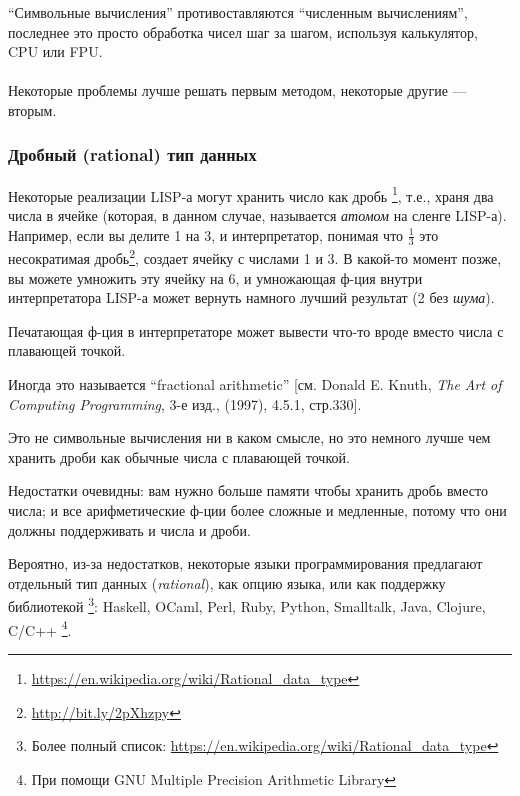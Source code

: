 ``Символьные вычисления'' противоставляются ``численным вычислениям'', последнее это просто обработка чисел шаг за шагом,
используя калькулятор, \ac{CPU} или \ac{FPU}.\\
\\
Некоторые проблемы лучше решать первым методом, некоторые другие --- вторым.

\subsubsection{Дробный (rational) тип данных}

Некоторые реализации LISP-а могут хранить число как дробь
\footnote{\url{https://en.wikipedia.org/wiki/Rational_data_type}}, т.е., храня два числа в ячейке (которая, в данном случае, называется \textit{атомом} на сленге LISP-а).
Например, если вы делите 1 на 3, и интерпретатор, понимая что $\frac{1}{3}$ это
несократимая дробь\footnote{\url{http://bit.ly/2pXhzpy}}, создает ячейку с числами 1 и 3.
В какой-то момент позже, вы можете умножить эту ячейку на 6, и умножающая ф-ция внутри интерпретатора LISP-а может вернуть
намного лучший результат (2 без \textit{шума}).

Печатающая ф-ция в интерпретаторе может вывести что-то вроде  вместо числа с плавающей точкой.

Иногда это называется ``fractional arithmetic'' [см. Donald E. Knuth, \textit{The Art of Computing Programming}, 3-е изд., (1997), 4.5.1, стр.330].

Это не символьные вычисления ни в каком смысле, но это немного лучше чем хранить дроби как обычные числа с плавающей точкой.

Недостатки очевидны: вам нужно больше памяти чтобы хранить дробь вместо числа;
и все арифметические ф-ции более сложные и медленные, потому что они должны поддерживать и числа и дроби.

Вероятно, из-за недостатков, некоторые языки программирования предлагают отдельный тип данных (\textit{rational}),
как опцию языка, или как поддержку библиотекой
\footnote{Более полный список: \url{https://en.wikipedia.org/wiki/Rational_data_type}}:
Haskell, OCaml, Perl, Ruby, Python, Smalltalk, Java, Clojure, C/C++
\footnote{При помощи GNU Multiple Precision Arithmetic Library}.

